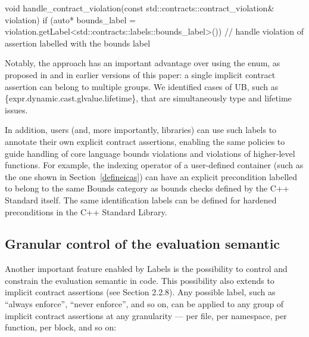 \begin{codeblock}
void handle_contract_violation(const std::contracts::contract_violation& violation)
{
  if (auto* bounds_label =
      violation.getLabel<std::contracts::labels::bounds_label>()) {
      // handle violation of assertion labelled with the bounds label
  }
}
\end{codeblock} 

%
%

Notably, the \cite{P3400R1} approach has an important advantage over using the  enum, as proposed in \cite{P3081R1} and in earlier versions of this paper: a single implicit contract assertion can belong to multiple groups. We identified cases of UB, such as \{expr.dynamic.cast.glvalue.lifetime\}, that are simultaneously type and lifetime issues.

In addition, users (and, more importantly, libraries) can use such labels to annotate their own explicit contract assertions, enabling the same policies to guide handling of core language bounds violations and violations of higher-level functions. For example, the indexing operator of a user-defined container (such as the one shown in Section~\ref{defineicas}) can have an explicit precondition labelled to belong to the same Bounds category as bounds checks defined by the C++ Standard itself. The same identification labels can be defined for hardened preconditions in the C++ Standard Library.

\subsection{Granular control of the evaluation semantic}
\label{semantic}

Another important feature enabled by Labels is the possibility to control and constrain the evaluation semantic in code. This possibility also extends to implicit contract assertions (see \cite{P3400R1} Section 2.2.8). Any possible label, such as ``always enforce'', ``never enforce'', and so on, can be applied to any group of implicit contract assertions at any granularity --- per file, per namespace, per function, per block, and so on:

